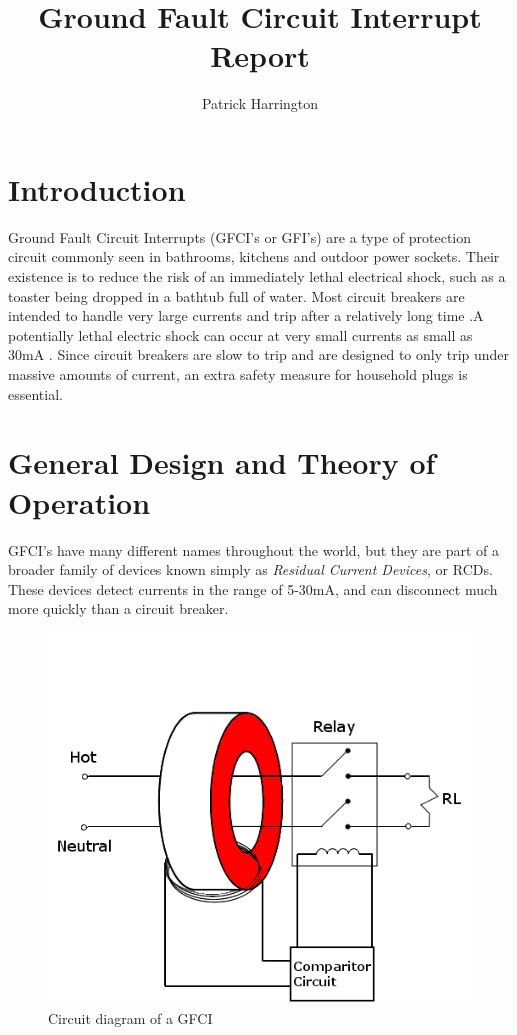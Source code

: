 \documentclass{article}
\title{Ground Fault Circuit Interrupt Report}
\author{Patrick Harrington}
\begin{document}
\maketitle

\section{Introduction}

Ground Fault Circuit Interrupts (GFCI's or GFI's) are a type of protection
circuit commonly seen in bathrooms, kitchens and outdoor power sockets. Their
existence is to reduce the risk of an immediately lethal electrical shock, such as a
toaster being dropped in a bathtub full of water. Most circuit breakers are
intended to handle very large currents and trip after a relatively long
time \cite{breakrate}.A potentially lethal electric shock can
occur at very small currents as small as 30mA \cite{death}. Since
circuit breakers are slow to trip and are designed to only trip under massive
amounts of current, an extra safety measure for household plugs is essential.

\section{General Design and Theory of Operation}

GFCI's have many different names throughout the world, but they are part of a broader family of
devices known simply as \emph{Residual Current Devices}, or RCDs. These
devices detect currents in the range of 5-30mA, and can disconnect much more
quickly than a circuit breaker. 

\begin{figure}[h!]
  \centering
  \includegraphics[scale=0.7]{circ.png}
  \caption{Circuit diagram of a GFCI}
  \label{fig:1}
\end{figure}
\end{document}
